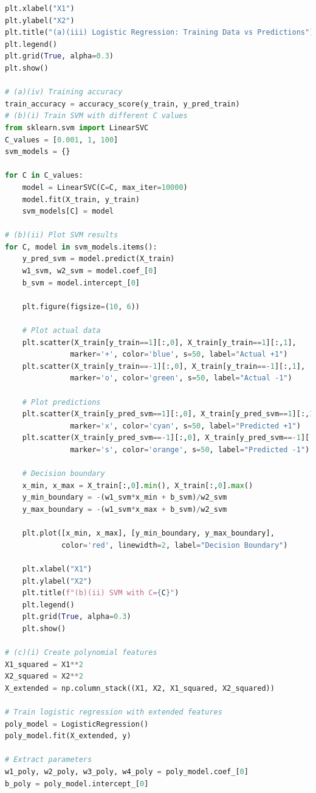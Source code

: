 \documentclass[12pt,a4paper]{article}
\begin{document}
\begin{lstlisting}[language=Python]
plt.xlabel("X1")
plt.ylabel("X2")
plt.title("(a)(iii) Logistic Regression: Training Data vs Predictions")
plt.legend()
plt.grid(True, alpha=0.3)
plt.show()

# (a)(iv) Training accuracy
train_accuracy = accuracy_score(y_train, y_pred_train)
# (b)(i) Train SVM with different C values
from sklearn.svm import LinearSVC
C_values = [0.001, 1, 100]
svm_models = {}

for C in C_values:
    model = LinearSVC(C=C, max_iter=10000)
    model.fit(X_train, y_train)
    svm_models[C] = model

# (b)(ii) Plot SVM results
for C, model in svm_models.items():
    y_pred_svm = model.predict(X_train)
    w1_svm, w2_svm = model.coef_[0]
    b_svm = model.intercept_[0]
    
    plt.figure(figsize=(10, 6))
    
    # Plot actual data
    plt.scatter(X_train[y_train==1][:,0], X_train[y_train==1][:,1], 
               marker='+', color='blue', s=50, label="Actual +1")
    plt.scatter(X_train[y_train==-1][:,0], X_train[y_train==-1][:,1], 
               marker='o', color='green', s=50, label="Actual -1")
    
    # Plot predictions
    plt.scatter(X_train[y_pred_svm==1][:,0], X_train[y_pred_svm==1][:,1], 
               marker='x', color='cyan', s=50, label="Predicted +1")
    plt.scatter(X_train[y_pred_svm==-1][:,0], X_train[y_pred_svm==-1][:,1], 
               marker='s', color='orange', s=50, label="Predicted -1")
    
    # Decision boundary
    x_min, x_max = X_train[:,0].min(), X_train[:,0].max()
    y_min_boundary = -(w1_svm*x_min + b_svm)/w2_svm
    y_max_boundary = -(w1_svm*x_max + b_svm)/w2_svm
    
    plt.plot([x_min, x_max], [y_min_boundary, y_max_boundary], 
             color='red', linewidth=2, label="Decision Boundary")
    
    plt.xlabel("X1")
    plt.ylabel("X2")
    plt.title(f"(b)(ii) SVM with C={C}")
    plt.legend()
    plt.grid(True, alpha=0.3)
    plt.show()

# (c)(i) Create polynomial features
X1_squared = X1**2
X2_squared = X2**2
X_extended = np.column_stack((X1, X2, X1_squared, X2_squared))

# Train logistic regression with extended features
poly_model = LogisticRegression()
poly_model.fit(X_extended, y)

# Extract parameters
w1_poly, w2_poly, w3_poly, w4_poly = poly_model.coef_[0]
b_poly = poly_model.intercept_[0]


\end{lstlisting}
\end{document}
